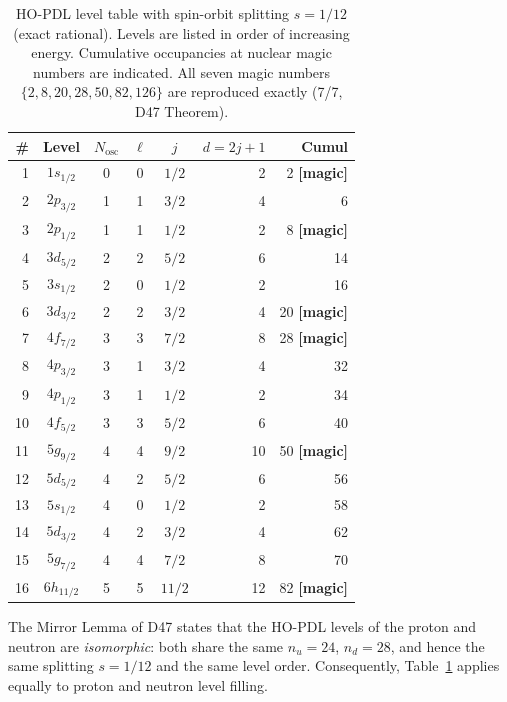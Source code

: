 \documentclass[11pt,a4paper]{article}
\theoremstyle{definition}
\theoremstyle{remark}
\newcommand{\nuu}{n_u}
\newcommand{\ndd}{n_d}
\begin{document}
\begin{table}[H]
\centering
\caption{HO-PDL level table with spin-orbit splitting $s = 1/12$ (exact rational). Levels are listed in order of increasing energy. Cumulative occupancies at nuclear magic numbers are indicated. All seven magic numbers $\{2,8,20,28,50,82,126\}$ are reproduced exactly (7/7, D47 Theorem).}
\label{tab:HOlevels}
\small
\begin{tabular}{rccccrr}
\toprule
\# & Level & $N_{\mathrm{osc}}$ & $\ell$ & $j$ & $d = 2j+1$ & Cumul \\
\midrule
1  & $1s_{1/2}$  & 0 & 0 & $1/2$  &  2 &   2 \quad\textbf{[magic]} \\
2  & $2p_{3/2}$  & 1 & 1 & $3/2$  &  4 &   6 \\
3  & $2p_{1/2}$  & 1 & 1 & $1/2$  &  2 &   8 \quad\textbf{[magic]} \\
4  & $3d_{5/2}$  & 2 & 2 & $5/2$  &  6 &  14 \\
5  & $3s_{1/2}$  & 2 & 0 & $1/2$  &  2 &  16 \\
6  & $3d_{3/2}$  & 2 & 2 & $3/2$  &  4 &  20 \quad\textbf{[magic]} \\
7  & $4f_{7/2}$  & 3 & 3 & $7/2$  &  8 &  28 \quad\textbf{[magic]} \\
8  & $4p_{3/2}$  & 3 & 1 & $3/2$  &  4 &  32 \\
9  & $4p_{1/2}$  & 3 & 1 & $1/2$  &  2 &  34 \\
10 & $4f_{5/2}$  & 3 & 3 & $5/2$  &  6 &  40 \\
11 & $5g_{9/2}$  & 4 & 4 & $9/2$  & 10 &  50 \quad\textbf{[magic]} \\
12 & $5d_{5/2}$  & 4 & 2 & $5/2$  &  6 &  56 \\
13 & $5s_{1/2}$  & 4 & 0 & $1/2$  &  2 &  58 \\
14 & $5d_{3/2}$  & 4 & 2 & $3/2$  &  4 &  62 \\
15 & $5g_{7/2}$  & 4 & 4 & $7/2$  &  8 &  70 \\
16 & $6h_{11/2}$ & 5 & 5 & $11/2$ & 12 &  82 \quad\textbf{[magic]} \\
\bottomrule
\end{tabular}
\end{table}

The Mirror Lemma of D47 states that the HO-PDL levels of the proton and neutron are \emph{isomorphic}: both share the same $\nuu = 24$, $\ndd = 28$, and hence the same splitting $s = 1/12$ and the same level order. Consequently, Table~\ref{tab:HOlevels} applies equally to proton and neutron level filling.
\end{document}
